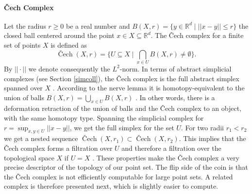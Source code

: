 \documentclass{article}
\DeclareMathOperator{\Cech}{\text{\v{C}ech}}
\begin{document}
\paragraph{\v{C}ech Complex \cite{bauer2017morse}} Let the radius $r \geq 0$ be a real number and $B(X,r) = \{y \in \mathbb{R}^d \; | \; ||x-y|| \leq r\}$ the closed ball centered around the point $x \in X \subseteq \mathbb{R}^d$. The \v{C}ech complex for a finite set of points $X$ is defined as
\begin{equation}
  \Cech(X,r) = \{ U \subseteq X  \; \rvert \; \bigcap_{x\in U}B(X,r) \neq \emptyset \}.
\end{equation}
By $||\cdot||$ we denote consequently the $L^2$-norm. In terms of abstract simplicial complexes (see Section \ref{simcoll}), the \v{C}ech complex is the full abstract simplex spanned over $X$ \cite{bauer2017morse}. According to the nerve lemma it is homotopy-equivalent to the union of balls $B(X,r) = \bigcup_{x \in U} B(X,r)$ \cite{borsuk}. In other words, there is a deformation retraction of the union of balls and the \v{C}ech complex to an object, with the same homotopy type. Spanning the simplicial complex for $r = \sup_{x,y \in U} ||x-y||$, we get the full simplex for the set $U$. For two radii $r_1 < r_2$ we get a nested sequence $\Cech(X,r_1) \subset \Cech(X,r_2)$. This implies that the \v{C}ech complex forms a filtration over $U$ and therefore a filtration over the topological space $X$ if $U = X$ \cite{bauer2017morse}. These properties make the \v{C}ech complex a very precise descriptor of the topology of our point set. The flip side of the coin is that the \v{C}ech complex is not efficiently computable for large point sets. A related complex is therefore presented next, which is slightly easier to compute.
\end{document}
